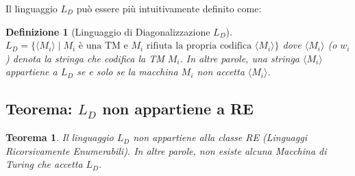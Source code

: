 \documentclass[a4paper]{article}
\newtheorem{theorem}{Teorema}
\newtheorem{definition}{Definizione}
\begin{document}
Il linguaggio $L_D$ può essere più intuitivamente definito come:
\begin{definition}[Linguaggio di Diagonalizzazione $L_D$]
$L_D = \{ \langle M_i \rangle \mid M_i \text{ è una TM e } M_i \text{ rifiuta la propria codifica } \langle M_i \rangle \}$
dove $\langle M_i \rangle$ (o $w_i$) denota la stringa che codifica la TM $M_i$.
In altre parole, una stringa $\langle M_i \rangle$ appartiene a $L_D$ se e solo se la macchina $M_i$ non accetta $\langle M_i \rangle$.
\end{definition}

\subsection{Teorema: $L_D$ non appartiene a RE}

\begin{theorem}
Il linguaggio $L_D$ non appartiene alla classe RE (Linguaggi Ricorsivamente Enumerabili). In altre parole, non esiste alcuna Macchina di Turing che accetta $L_D$.
\end{theorem}
\end{document}
